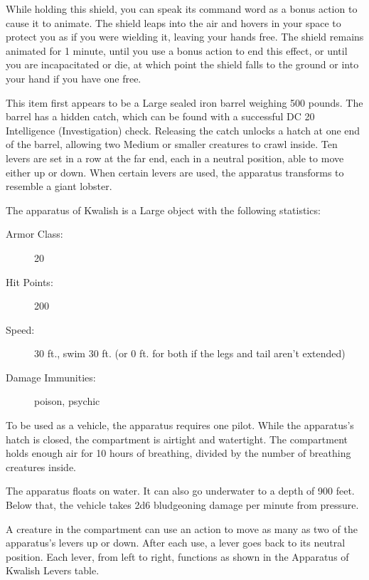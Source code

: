 \documentclass[10pt,a4paper,twoside,bg=print,twocolumn,openany,nodeprecatedcode]{dndbook}
\begin{document}
While holding this shield, you can speak its command word as a bonus action to cause it to animate. The shield leaps into the air and hovers in your space to protect you as if you were wielding it, leaving your hands free. The shield remains animated for 1 minute, until you use a bonus action to end this effect, or until you are incapacitated or die, at which point the shield falls to the ground or into your hand if you have one free.

This item first appears to be a Large sealed iron barrel weighing 500 pounds. The barrel has a hidden catch, which can be found with a successful DC 20 Intelligence (Investigation) check. Releasing the catch unlocks a hatch at one end of the barrel, allowing two Medium or smaller creatures to crawl inside. Ten levers are set in a row at the far end, each in a neutral position, able to move either up or down. When certain levers are used, the apparatus transforms to resemble a giant lobster.

The apparatus of Kwalish is a Large object with the following statistics:


\begin{description}
\item[Armor Class:]
20
\item[Hit Points:]
200
\item[Speed:]
30 ft., swim 30 ft. (or 0 ft. for both if the legs and tail aren't extended)
\item[Damage Immunities:]
poison, psychic
\end{description}

To be used as a vehicle, the apparatus requires one pilot. While the apparatus's hatch is closed, the compartment is airtight and watertight. The compartment holds enough air for 10 hours of breathing, divided by the number of breathing creatures inside.

The apparatus floats on water. It can also go underwater to a depth of 900 feet. Below that, the vehicle takes 2d6 bludgeoning damage per minute from pressure.

A creature in the compartment can use an action to move as many as two of the apparatus's levers up or down. After each use, a lever goes back to its neutral position. Each lever, from left to right, functions as shown in the Apparatus of Kwalish Levers table.
\end{document}
